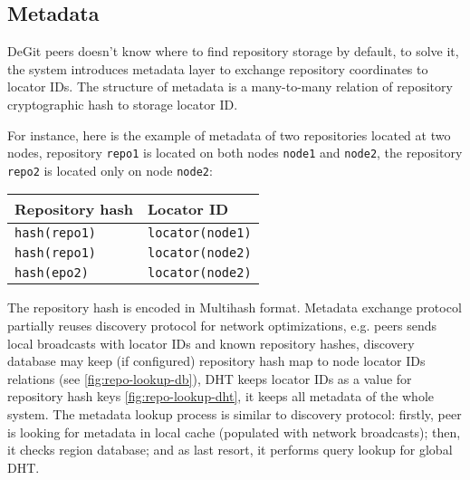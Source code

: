 \documentclass[acmlarge, screen, nonacm]{acmart}
\newcommand{\code}[1]{\texttt{#1}}
\begin{document}
\subsection{Metadata}
\label{sec:metadata}

DeGit peers doesn't know where to find repository storage by default,
to solve it, the system introduces metadata layer to exchange repository coordinates
to locator IDs. The structure of metadata is a many-to-many relation of
repository cryptographic hash to storage locator ID.

For instance, here is the example of metadata of two repositories located at two nodes,
repository \code{repo1} is located on both nodes \code{node1} and \code{node2},
the repository \code{repo2} is located only on node \code{node2}:

\begin{tabular}{l | l}
  Repository hash & Locator ID \\ \hline
  \code{hash(repo1)} & \code{locator(node1)} \\
  \code{hash(repo1)} & \code{locator(node2)} \\
  \code{hash(epo2)} & \code{locator(node2)} \\
\end{tabular}

The repository hash is encoded in Multihash format. Metadata exchange protocol partially reuses
discovery protocol for network optimizations, e.g. peers sends local broadcasts
with locator IDs and known repository hashes, discovery database may keep (if configured)
repository hash map to node locator IDs relations (see \ref{fig:repo-lookup-db}),
DHT keeps locator IDs as a value for repository hash keys \ref{fig:repo-lookup-dht},
it keeps all metadata of the whole system. The metadata lookup process is similar to discovery protocol:
firstly, peer is looking for metadata in local cache (populated with network broadcasts); then, it checks
region database; and as last resort, it performs query lookup for global DHT.
\end{document}
